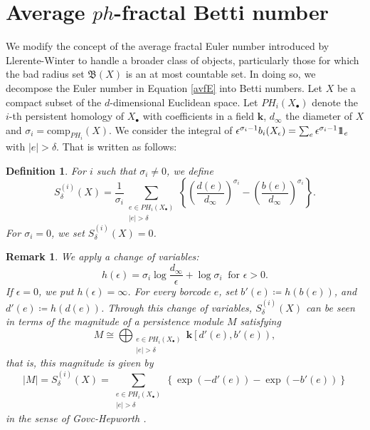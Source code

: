 \documentclass[12pt]{amsart}
\numberwithin{equation}{section}
\newcommand\jeden {1\hskip-3.5pt1}
\newtheorem{dfn}[thm]{\bf Definition}
\newtheorem{rem}[thm]{\bf Remark}
\begin{document}
\section{Average $ph$-fractal Betti number}
We modify the concept of the average fractal Euler number introduced by Llerente-Winter\cite{LW07} to handle a broader class of objects, particularly those for which the bad radius set $\mathfrak{B}(X)$ is an at most countable set. 
In doing so, we decompose the Euler number in Equation \ref{avfE} into Betti numbers. 
Let $X$ be a compact subset of the $d$-dimensional Euclidean space. 
Let $PH_i(X_\bullet)$ denote the $i$-th persistent homology of $X_\bullet$ with coefficients in a field $\mathbf{k}$, $d_\infty$ the diameter of $X$ and $\sigma_i = \mathrm{comp}_{PH_i}(X)$.
We consider the integral of $\epsilon^{\sigma_i -1} b_i(X_\epsilon) = \sum_{e} \epsilon^{\sigma_i -1} \jeden_e$ with $|e|>\delta$. 
That is written as follows: 
\begin{dfn}
    For $i$ such that $\sigma_i \neq 0$, we define
    \begin{equation*}
        S_\delta^{(i)}(X) = \frac{1}{\sigma_i} \sum_{\substack{e \in PH_i(X_\bullet) \\ |e| >\delta}} \left\{ \left( \frac{d(e)}{d_\infty} \right)^{\sigma_i} - \left( \frac{b(e)}{d_\infty}\right)^{\sigma_i} \right\}.
    \end{equation*}
    For $\sigma_i = 0$, we set $S_\delta^{(i)}(X) = 0$.  
\end{dfn}

\begin{rem}
    We apply a change of variables:
    \begin{equation*}
        h(\epsilon) = \sigma_i \log \frac{d_\infty}{\epsilon} + \log \sigma_i \ \text{ for } \epsilon>0.
    \end{equation*}
    If $\epsilon = 0$, we put $h(\epsilon) = \infty$. 
    For every borcode $e$, set $b'(e) \coloneqq h(b(e))$, and $d'(e) \coloneqq h(d(e))$.
    Through this change of variables, $S_\delta^{(i)}(X)$ can be seen in terms of the magnitude of a persistence module $M$ satisfying
    \begin{equation*}
        M \cong \bigoplus_{\substack{e \in PH_i(X_\bullet) \\ |e| >\delta}} \mathbf{k} \left[d'(e), b'(e) \right),
    \end{equation*}
     that is, this magnitude is given by
    \begin{equation*}
        |M| = S_\delta^{(i)}(X) = \sum_{\substack{e \in PH_i(X_\bullet) \\ |e| >\delta}} \left\{ \exp\left(-d'(e)\right) - \exp\left(-b'(e)\right) \right\}
    \end{equation*}
    in the sense of Govc-Hepworth \cite{GH21}.
\end{rem}  
\end{document}
